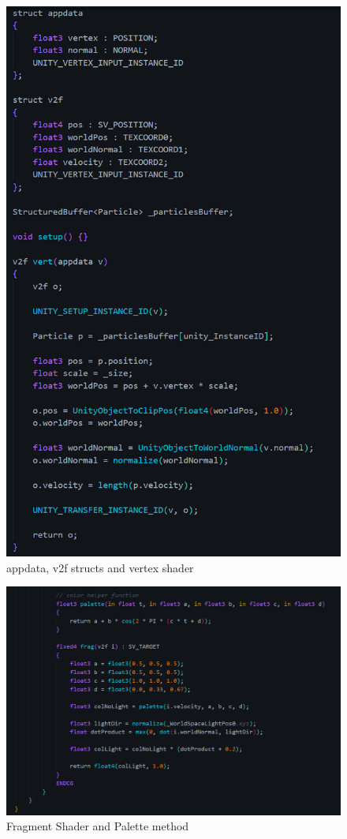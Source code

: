 \documentclass[a4paper, 12pt]{article}
\begin{document}
    \begin{figure}[H]
        \centering
        \includegraphics[height=0.9\textheight]{newShader2.png}
        \caption{appdata, v2f structs and vertex shader}
    \end{figure}

    \begin{figure}[H]
        \centering
        \includegraphics[width=\textwidth]{newShader3.png}
        \caption{Fragment Shader and Palette method}
    \end{figure}
\end{document}
